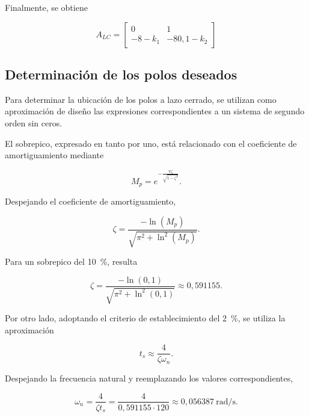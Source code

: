 \documentclass[10pt]{article}
\begin{document}
Finalmente, se obtiene

\begin{equation}
    \boxed{
        A_{LC}=
        \begin{bmatrix}
            0 & 1\\
            -8-k_1 & -80{,}1-k_2
        \end{bmatrix}
    }
\end{equation}


\subsection{Determinación de los polos deseados}

Para determinar la ubicación de los polos a lazo cerrado,
se utilizan como aproximación de diseño las expresiones
correspondientes a un sistema de segundo orden sin ceros.

El sobrepico, expresado en tanto por uno, está relacionado
con el coeficiente de amortiguamiento mediante

\begin{equation}
    M_p=
    e^{-\frac{\pi\zeta}{\sqrt{1-\zeta^2}}}.
\end{equation}

Despejando el coeficiente de amortiguamiento,

\begin{equation}
    \zeta=
    \frac{-\ln(M_p)}
    {\sqrt{\pi^2+\ln^2(M_p)}}.
\end{equation}

Para un sobrepico del 10~\%, resulta

\begin{equation}
    \zeta=
    \frac{-\ln(0{,}1)}
    {\sqrt{\pi^2+\ln^2(0{,}1)}}
    \approx 0{,}591155.
\end{equation}

Por otro lado, adoptando el criterio de establecimiento
del 2~\%, se utiliza la aproximación

\begin{equation}
    t_s\approx\frac{4}{\zeta\omega_n}.
\end{equation}

Despejando la frecuencia natural y reemplazando
los valores correspondientes,

\begin{equation}
    \omega_n=
    \frac{4}{\zeta t_s}
    =
    \frac{4}{0{,}591155\cdot120}
    \approx 0{,}056387\ \text{rad/s}.
\end{equation}
\end{document}
